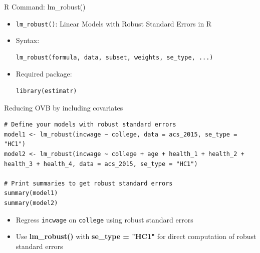 \documentclass[dvipsnames,hyperref={pdfpagelabels=false}]{beamer}
\begin{document}
\begin{frame}[fragile]{R Command: lm\_robust()}
	\begin{itemize}
		\item \texttt{lm\_robust()}: Linear Models with Robust Standard Errors in R
		\vspace{0.2cm}
		\item Syntax:
		\vspace{0.2cm}
\begin{lstlisting}
lm_robust(formula, data, subset, weights, se_type, ...)
\end{lstlisting}
		\item Required package:
\begin{lstlisting}
library(estimatr)
\end{lstlisting}
	\end{itemize}
\end{frame}

\begin{frame}[fragile]{Reducing OVB by including covariates}
\begin{lstlisting}
# Define your models with robust standard errors
model1 <- lm_robust(incwage ~ college, data = acs_2015, se_type = "HC1")
model2 <- lm_robust(incwage ~ college + age + health_1 + health_2 + health_3 + health_4, data = acs_2015, se_type = "HC1")

# Print summaries to get robust standard errors
summary(model1)
summary(model2)
\end{lstlisting}
		\vspace{0.2cm}
	\begin{itemize}
		\item Regress \texttt{incwage} on \texttt{college} using robust standard errors
		\vspace{0.2cm}
		\item Use \textbf{lm\_robust()} with \textbf{se\_type = "HC1"} for direct computation of robust standard errors
	\end{itemize}
\end{frame}
\end{document}
